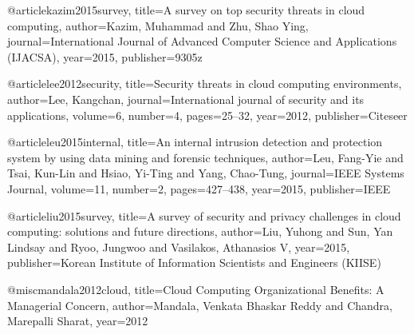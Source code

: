 @article{kazim2015survey,
  title={A survey on top security threats in cloud computing},
  author={Kazim, Muhammad and Zhu, Shao Ying},
  journal={International Journal of Advanced Computer Science and Applications (IJACSA)},
  year={2015},
  publisher={9305z}
}













@article{lee2012security,
  title={Security threats in cloud computing environments},
  author={Lee, Kangchan},
  journal={International journal of security and its applications},
  volume={6},
  number={4},
  pages={25--32},
  year={2012},
  publisher={Citeseer}
}













@article{leu2015internal,
title={An internal intrusion detection and protection system by using data mining and forensic techniques},
author={Leu, Fang-Yie and Tsai, Kun-Lin and Hsiao, Yi-Ting and Yang, Chao-Tung},
journal={IEEE Systems Journal},
volume={11},
number={2},
pages={427--438},
year={2015},
publisher={IEEE}
}







@article{liu2015survey,
  title={A survey of security and privacy challenges in cloud computing: solutions and future directions},
  author={Liu, Yuhong and Sun, Yan Lindsay and Ryoo, Jungwoo and Vasilakos, Athanasios V},
  year={2015},
  publisher={Korean Institute of Information Scientists and Engineers (KIISE)}
}












@misc{mandala2012cloud,
  title={Cloud Computing Organizational Benefits: A Managerial Concern},
  author={Mandala, Venkata Bhaskar Reddy and Chandra, Marepalli Sharat},
  year={2012}
}













